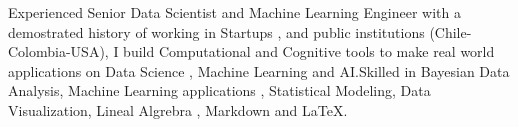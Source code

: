 

\begin{cvparagraph}

Experienced Senior Data Scientist and Machine Learning Engineer with a demostrated history of working in Startups , and public institutions (Chile-Colombia-USA), I build Computational and Cognitive tools to make real world applications on Data Science , Machine Learning and AI.Skilled in Bayesian Data Analysis, Machine Learning applications , Statistical Modeling, Data Visualization, Lineal Algrebra , Markdown and LaTeX. 
\end{cvparagraph}
